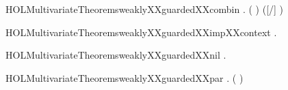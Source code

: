 \newcommand{\HOLMultivariateTheoremsweaklyXXguardedXXbackwardXXrules}{\UseVerbatim{HOLMultivariateTheoremsweaklyXXguardedXXbackwardXXrules}}
\begin{SaveVerbatim}{HOLMultivariateTheoremsweaklyXXguardedXXcombin}
\HOLTokenTurnstile{} \HOLSymConst{\HOLTokenForall{}}  .
         \HOLSymConst{\HOLTokenConj{}}    \HOLSymConst{\HOLTokenConj{}}    \HOLSymConst{\HOLTokenConj{}}
       (  \HOLSymConst{=}  ) \HOLSymConst{\HOLTokenImp{}}
         ([/] )
\end{SaveVerbatim}
\newcommand{\HOLMultivariateTheoremsweaklyXXguardedXXcombin}{\UseVerbatim{HOLMultivariateTheoremsweaklyXXguardedXXcombin}}
\begin{SaveVerbatim}{HOLMultivariateTheoremsweaklyXXguardedXXimpXXcontext}
\HOLTokenTurnstile{} \HOLSymConst{\HOLTokenForall{}} .    \HOLSymConst{\HOLTokenImp{}}   
\end{SaveVerbatim}
\newcommand{\HOLMultivariateTheoremsweaklyXXguardedXXimpXXcontext}{\UseVerbatim{HOLMultivariateTheoremsweaklyXXguardedXXimpXXcontext}}
\begin{SaveVerbatim}{HOLMultivariateTheoremsweaklyXXguardedXXnil}
\HOLTokenTurnstile{} \HOLSymConst{\HOLTokenForall{}}.   
\end{SaveVerbatim}
\newcommand{\HOLMultivariateTheoremsweaklyXXguardedXXnil}{\UseVerbatim{HOLMultivariateTheoremsweaklyXXguardedXXnil}}
\begin{SaveVerbatim}{HOLMultivariateTheoremsweaklyXXguardedXXpar}
\HOLTokenTurnstile{} \HOLSymConst{\HOLTokenForall{}}  .
         ( \HOLSymConst{\ensuremath{\parallel}} ) \HOLSymConst{\HOLTokenImp{}}
          \HOLSymConst{\HOLTokenConj{}}   
\end{SaveVerbatim}
